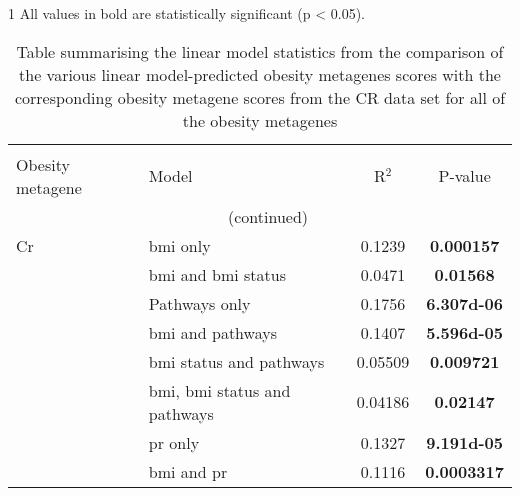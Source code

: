 	\begin{ThreePartTable}
			\begin{TableNotes}
				\begin{footnotesize}
				\item [1] All values in bold are statistically significant (p \textless{} 0.05).
				\end{footnotesize}
			\end{TableNotes}

			\begin{longtable}{llcc}
				\centering
				\caption[Summary of the statistics from the comparison of all the predicted obesity metagene scores with the corresponding obesity metagenes from the CR data]{Table summarising the linear model statistics from the comparison of the various linear model-predicted obesity metagenes scores with the corresponding obesity metagene scores from the CR data set for all of the obesity metagenes}
				\label{tab:prediction_summary_cr}\\
				Obesity metagene & Model                         & R$^2$      & P-value   \\
				\endfirsthead
				\multicolumn{4}{c}{\tablename\ \thetable{}\ (continued)}\\
				\hline
				\hline
				\endhead
				\hline
				\hline
				\rule{0pt}{2.25ex}Cr      & \gls{bmi} only                           & 0.1239     & {\bfseries 0.000157}\tnote{1}  \\
		                                  & \gls{bmi} and \gls{bmi} status           & 0.0471     & \bfseries 0.01568   \\
		                                  & Pathways only                            & 0.1756     & \bfseries \num{6.307d-06} \\
		                                  & \gls{bmi} and pathways                   & 0.1407     & \bfseries \num{5.596d-05} \\
		                                  & \gls{bmi} status and pathways            & 0.05509    & \bfseries 0.009721  \\
		                                  & \gls{bmi}, \gls{bmi} status and pathways & 0.04186    & \bfseries 0.02147   \\
		                                  & \gls{pr} only                            & 0.1327     & \bfseries \num{9.191d-05} \\
		                                  & \gls{bmi} and \gls{pr}                   & 0.1116     & \bfseries 0.0003317 \\

\end{longtable}
\end{ThreePartTable}
